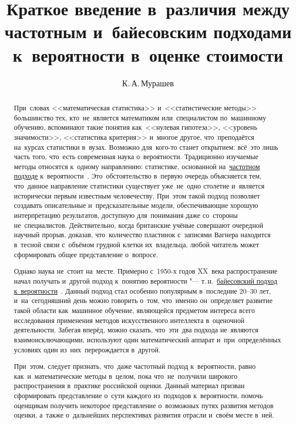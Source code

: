 \documentclass[]{scrartcl}
\title{Краткое введение в~различия между частотным и~байесовским подходами к~вероятности в~оценке стоимости}
\author{К.\,А.\,Мурашев}
\begin{document}
\maketitle

\begin{abstract}
	При~словах <<математическая статистика>> и~<<статистические методы>> большинство тех, кто~не~является математиком или~специалистом по~машинному обучению, вспоминают такие понятия как~<<нулевая гипотеза>>, <<уровень значимости>>, <<статистика критерия>>  и~многое другое, что~преподаётся на~курсах статистики в~вузах. Возможно для~кого-то станет открытием: всё~это лишь часть того, что~есть современная наука о~вероятности. Традиционно изучаемые методы относятся к~одному направлению: статистике, основанной на~\href{https://ru.wikipedia.org/wiki/Частотная_вероятность}{частотном подходе} к~вероятности~\cite{Wiki:Freq-probability}. Это~обстоятельство в~первую очередь объясняется тем, что~данное направление статистики существует уже~не~одно столетие и~является исторически первым известным человечеству. При~этом такой подход позволяет создавать описательные и~предсказательные модели, обеспечивающие хорошую интерпретацию результатов, доступную для~понимания даже со~стороны не~специалистов. Действительно, когда британские учёные совершают очередной научный прорыв, доказав, что~количество пластинок с~записями Вагнера находится в~тесной связи с~объёмом грудной клетки их~владельца, любой читатель может сформировать общее представление о~вопросе.
	
	Однако наука не~стоит на~месте. Примерно с~1950-х годов XX~века распространение начал получать и~другой подход к~понятию вероятности "--- т.\,н.~\href{https://ru.wikipedia.org/wiki/Байесовская_вероятность}{байесовский подход к~вероятности}~\cite{Wiki:Bayes-prob}. Данный подход стал особенно популярным в~последние 20--30 лет, и~на~сегодняшний день можно говорить о~том, что~именно он~определяет развитие такой области как~машинное обучение, являющейся предметом интереса всего исследования применения методов искусственного интеллекта в~оценочной деятельности. Забегая вперёд, можно сказать, что~эти~два подхода не~являются взаимоисключающими, используют один математический аппарат и~при~определённых условиях один из~них~перерождается в~другой.
	
	При~этом, следует признать, что~даже частотный подход к~вероятности, равно как~и~математические методы в~целом, пока что~не~получили широкого распространения в~практике российской оценки. Данный материал призван сформировать представление о~сути каждого из~подходов к~вероятности, помочь оценщикам получить некоторое представление о~возможных путях развития методов оценки, а~также о~дальнейших перспективах развития отрасли и~своём месте в~ней. 
\end{abstract}
\end{document}
